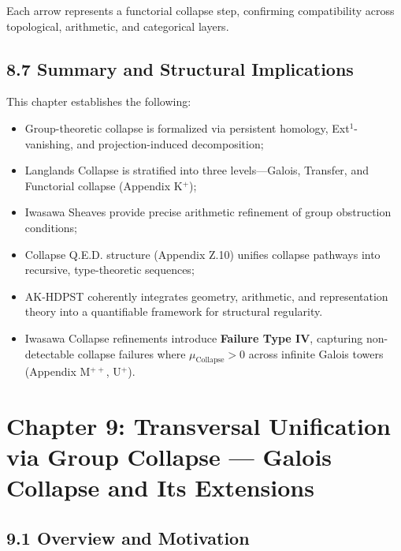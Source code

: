 \documentclass[11pt]{article}
\begin{document}
Each arrow represents a functorial collapse step, confirming compatibility across topological, arithmetic, and categorical layers.

\subsection*{8.7 Summary and Structural Implications}

This chapter establishes the following:

\begin{itemize}
    \item Group-theoretic collapse is formalized via persistent homology, Ext$^1$-vanishing, and projection-induced decomposition;
    \item Langlands Collapse is stratified into three levels—Galois, Transfer, and Functorial collapse (Appendix K$^+$);
    \item Iwasawa Sheaves provide precise arithmetic refinement of group obstruction conditions;
    \item Collapse Q.E.D. structure (Appendix Z.10) unifies collapse pathways into recursive, type-theoretic sequences;
    \item AK-HDPST coherently integrates geometry, arithmetic, and representation theory into a quantifiable framework for structural regularity.
\end{itemize}

\begin{itemize}
  \item Iwasawa Collapse refinements introduce \textbf{Failure Type IV}, capturing non-detectable collapse failures where $\mu_{\mathrm{Collapse}} > 0$ across infinite Galois towers (Appendix M$^{++}$, U$^+$).
\end{itemize}




\section{Chapter 9: Transversal Unification via Group Collapse — Galois Collapse and Its Extensions}

\subsection*{9.1 Overview and Motivation}
\end{document}
